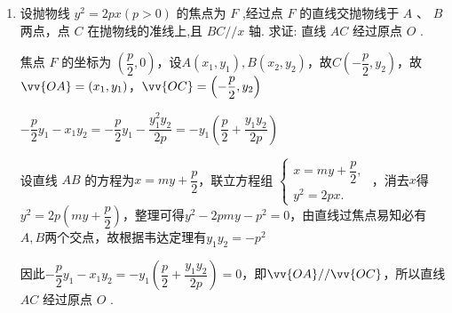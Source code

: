 \begin{enumerate}
    \item 设抛物线 ${y}^{2} = {2px}\left( {p > 0}\right)$ 的焦点为 ${F}$ ,经过点 ${F}$ 的直线交抛物线于 ${A}$ 、 ${B}$ 两点，点 ${C}$ 在抛物线的准线上,且 ${{BC}}//x$ 轴. 求证: 直线 ${{AC}}$ 经过原点 ${O}$ .
    \begin{jieda}
        焦点 $F$ 的坐标为 $\left( {\dfrac{p}{2},0}\right)$，设$A(x_1, y_1), B(x_2, y_2)$，故$C\left(-\dfrac{p}{2}, y_2\right)$，故$\vv{OA} = (x_1, y_1)$，$\vv{OC} = \left(-\dfrac{p}{2}, y_2\right)$
        
        $-\dfrac{p}{2}y_1 - x_1y_2 = -\dfrac{p}{2}y_1 - \dfrac{y_1^2y_2}{2p} = -y_1\left(\dfrac{p}{2}+\dfrac{y_1y_2}{2p}\right)$
        
        设直线 ${AB}$ 的方程为$x = my+\dfrac{p}{2}$，联立方程组 $\left\{  \begin{array}{l} 
            x = my+\dfrac{p}{2}, \\  
            {y}^{2} = {2px}. \end{array}\right.$ ，消去$x$得 ${y}^{2} = 2p\left(my+\dfrac{p}{2}\right)$，整理可得$y^2 - 2pmy - p^2 = 0$，由直线过焦点易知必有$A, B$两个交点，故根据韦达定理有${y}_{1}{y}_{2} =  - {p}^{2}$
            
            因此$-\dfrac{p}{2}y_1 - x_1y_2 = -y_1\left(\dfrac{p}{2}+\dfrac{y_1y_2}{2p}\right) = 0$，即$\vv{OA} // \vv{OC}$，所以直线 ${{AC}}$ 经过原点 ${O}$ .
    \end{jieda}
\end{enumerate}

\clearpage

